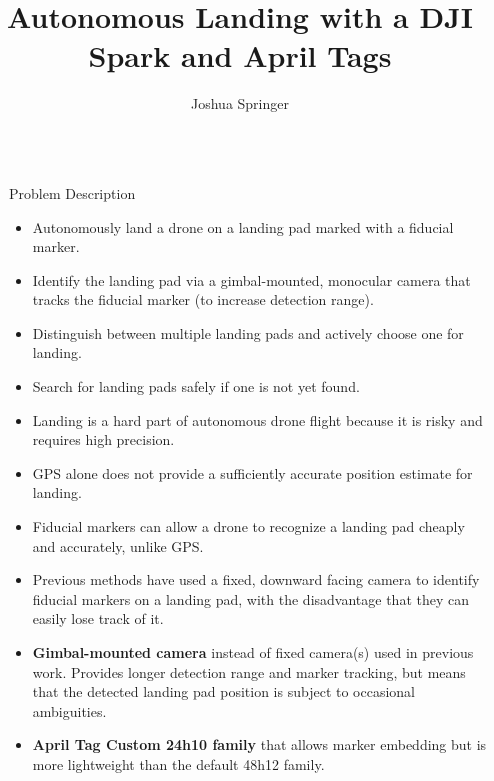 \documentclass[final, 20pt]{beamer}
\title{Autonomous Landing with a DJI Spark and April Tags}
\author{Joshua Springer}
\institute[shortinst]{Reykjavík University}
\newlength{\sepwidth}
\newlength{\colwidth}
\newcommand{\separatorcolumn}{\begin{column}{\sepwidth}\end{column}}
\begin{document}
\begin{frame}[t]
\begin{columns}[t]
\separatorcolumn

\begin{column}{\colwidth}

  \begin{alertblock}{Problem Description}


    \begin{itemize}
      \item Autonomously land a drone on a landing pad marked with a fiducial marker.
      \item Identify the landing pad via a gimbal-mounted, monocular camera that tracks the fiducial marker (to increase detection range).
      \item Distinguish between multiple landing pads and actively choose one for landing.
      \item Search for landing pads safely if one is not yet found.
    \end{itemize}


    \begin{itemize}
      \item Landing is a hard part of autonomous drone flight because it is risky and requires high precision.
      \item GPS alone does not provide a sufficiently accurate position estimate for landing.
      \item Fiducial markers can allow a drone to recognize a landing pad cheaply and accurately, unlike GPS.
      \item Previous methods have used a fixed, downward facing camera to identify fiducial markers on a landing pad,
            with the disadvantage that they can easily lose track of it.
    \end{itemize}


    \begin{itemize}
      \item \textbf{Gimbal-mounted camera} instead of fixed camera(s) used in previous work.
                    Provides longer detection range and marker tracking, but means that the detected landing pad position is subject to occasional ambiguities.
      \item \textbf{April Tag Custom 24h10 family} that allows marker embedding but is more lightweight than the default 48h12 family.
    \end{itemize}


\end{alertblock}
\end{column}
\end{columns}
\end{frame}
\end{document}
